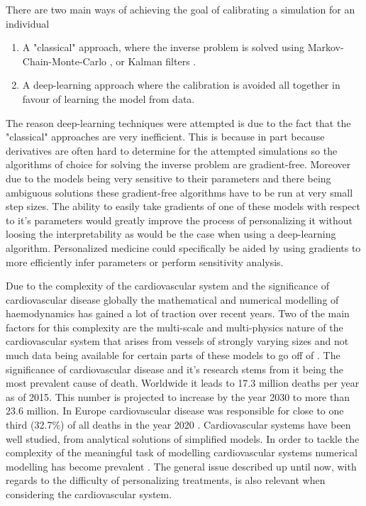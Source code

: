 \documentclass[a4paper, oneside]{discothesis}
\begin{document}
There are two main ways of achieving the goal of calibrating a simulation for an individual
\begin{enumerate}
	\item A "classical" approach, where the inverse problem is solved using Markov-Chain-Monte-Carlo \cite{melis2017gaussian}, or Kalman filters \cite{manganotti2022modeling}.
	\item A deep-learning approach where the calibration is avoided all together in favour of learning the model from data. \cite{kissas2020machine,arzani2022machine}
\end{enumerate}
The reason deep-learning techniques were attempted is due to the fact that the "classical" approaches are very inefficient.
This is because in part because derivatives are often hard to determine for the attempted simulations so the algorithms of choice for solving the inverse problem are gradient-free. 
Moreover due to the models being very sensitive to their parameters and there being ambiguous solutions \cite{nolte2022inverse,quick2001infinite} these gradient-free algorithms have to be run at very small step sizes. \cite{taylor2009patient,tuccio2022parameter,marsden2014optimization,mineroff2019optimization,bozkurt2022patient}
The ability to easily take gradients of one of these models with respect to it's parameters would greatly improve the process of personalizing it without loosing the interpretability as would be the case when using a deep-learning algorithm.
Personalized medicine could specifically be aided by using gradients to more efficiently infer parameters or perform sensitivity analysis.

Due to the complexity of the cardiovascular system and the significance of cardiovascular disease globally the mathematical and numerical modelling of haemodynamics has gained a lot of traction over recent years.
Two of the main factors for this complexity are the multi-scale and multi-physics nature of the cardiovascular system that arises from vessels of strongly varying sizes and not much data being available for certain parts of these models to go off of \cite{quarteroni2016geometric}.
The significance of cardiovascular disease and it's research stems from it being the most prevalent cause of death.
Worldwide it leads to 17.3 million deaths per year as of 2015.
This number is projected to increase by the year 2030 to more than 23.6 million. \cite{update2015heart}
In Europe cardiovascular disease was responsible for close to one third (32.7\%) of all deaths in the year 2020 \cite{Coelho2020}.
Cardiovascular systems have been well studied, from analytical solutions of simplified models.
In order to tackle the complexity of the meaningful task of modelling cardiovascular systems numerical modelling has become prevalent \cite{formaggia2009multiscale,quarteroni2016geometric,black2020p14,el2018investigating,qureshi2014numerical,reichold2009vascular}.
The general issue described up until now, with regards to the difficulty of personalizing treatments, is also relevant when considering the cardiovascular system.
\end{document}
